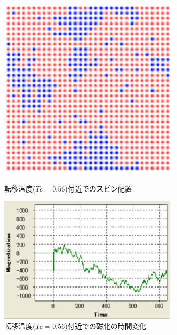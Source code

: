\documentclass[11pt,a4]{jarticle}
\begin{document}
\begin{figure}[htbp]
 \begin{minipage}{0.45\hsize}
  \begin{center}
   \includegraphics[width=0.9\hsize]{criticalT_config.eps}
  \end{center}
  \caption{転移温度($Tc=0.56$)付近でのスピン配置}
  \label{fig:criticalT_config}
 \end{minipage}
 \begin{minipage}{0.55\hsize}
  \begin{center}
   \includegraphics[width=0.9\hsize]{criticalT_transition.eps}
  \end{center}
  \caption{転移温度($Tc=0.56$)付近での磁化の時間変化}
  \label{fig:criticalT_transition}
 \end{minipage}
\end{figure}
\end{document}

